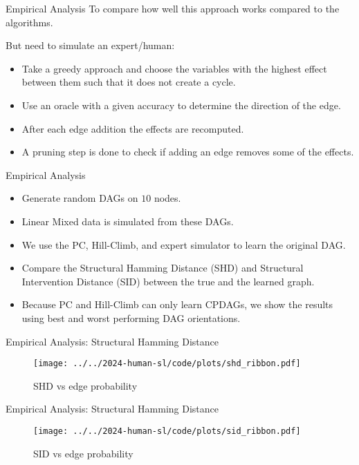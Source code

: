 \documentclass{beamer}
\begin{document}
\begin{frame}{Empirical Analysis}
	To compare how well this approach works compared to the algorithms.

	But need to simulate an expert/human:
	\begin{itemize}
		\item Take a greedy approach and choose the variables with the highest effect between them such that it does not create a cycle.
		\item Use an oracle with a given accuracy to determine the direction of the edge.
		\item After each edge addition the effects are recomputed.
		\item A pruning step is done to check if adding an edge removes some of the effects.
	\end{itemize}
\end{frame}

\begin{frame}{Empirical Analysis}
	\begin{itemize}
		\item Generate random DAGs on $10$ nodes.
		\item Linear Mixed data is simulated from these DAGs.
		\item We use the PC, Hill-Climb, and expert simulator to learn the original DAG.
		\item Compare the Structural Hamming Distance (SHD) and Structural Intervention Distance (SID) between the true and the learned graph.
		\item Because PC and Hill-Climb can only learn CPDAGs, we show the results using best and worst performing DAG orientations.
	\end{itemize}
\end{frame}


\begin{frame}{Empirical Analysis: Structural Hamming Distance}
	\begin{figure}
		\centering
		\texttt{[image: ../../2024-human-sl/code/plots/shd\_ribbon.pdf]}
		\caption{SHD vs edge probability}
	\end{figure}
\end{frame}

\begin{frame}{Empirical Analysis: Structural Hamming Distance}
	\begin{figure}
		\centering
		\texttt{[image: ../../2024-human-sl/code/plots/sid\_ribbon.pdf]}
		\caption{SID vs edge probability}
	\end{figure}
\end{frame}
\end{document}
